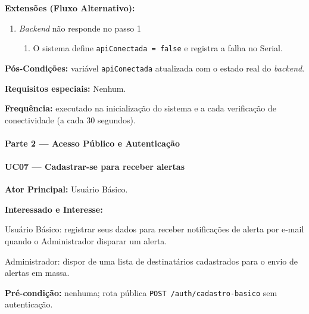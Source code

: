 \textbf{Extensões (Fluxo Alternativo):}

\begin{enumerate}
  \renewcommand{\theenumi}{1a}
  \renewcommand{\labelenumi}{\theenumi.}
  \item \textit{Backend} não responde no passo 1
  \begin{enumerate}
  \item O sistema define \texttt{apiConectada = false} e
        registra a falha no Serial.
  \end{enumerate}
\end{enumerate}

\textbf{Pós-Condições:} variável \texttt{apiConectada} atualizada
com o estado real do \textit{backend}.

\textbf{Requisitos especiais:} Nenhum.

\textbf{Frequência:} executado na inicialização do sistema e a
cada verificação de conectividade (a cada 30 segundos).

\paragraph{Parte 2 --- Acesso Público e Autenticação}\hfill\break

\paragraph{UC07 --- Cadastrar-se para receber alertas}\hfill\break

\textbf{Ator Principal:} Usuário Básico.

\textbf{Interessado e Interesse:}

Usuário Básico: registrar seus dados para receber notificações
de alerta por e-mail quando o Administrador disparar um alerta.

Administrador: dispor de uma lista de destinatários cadastrados
para o envio de alertas em massa.

\textbf{Pré-condição:} nenhuma; rota pública
\texttt{POST /auth/cadastro-basico} sem autenticação.

